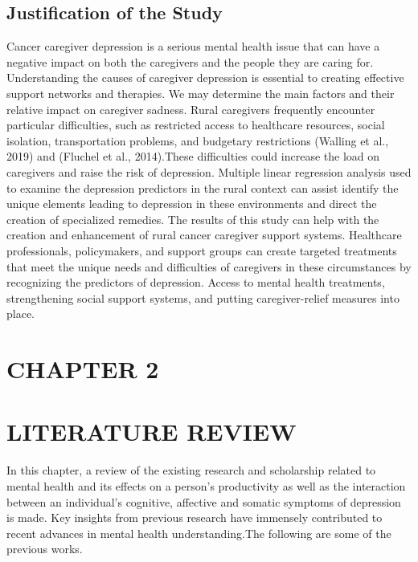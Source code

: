 \documentclass{article}
\numberwithin{equation}{section}
\begin{document}
\subsection{Justification of the Study}
Cancer caregiver depression is a serious mental health issue that can have a negative impact on both the caregivers and the people they are caring for. Understanding the causes of caregiver depression is essential to creating effective support networks and therapies. We may determine the main factors and their relative impact on caregiver sadness. Rural caregivers frequently encounter particular difficulties, such as restricted access to healthcare resources, social isolation, transportation problems, and budgetary restrictions (Walling et al., 2019) and (Fluchel et al., 2014).These difficulties could increase the load on caregivers and raise the risk of depression. Multiple linear regression analysis used to examine the depression predictors in the rural context can assist identify the unique elements leading to depression in these environments and direct the creation of specialized remedies. The results of this study can help with the creation and enhancement of rural cancer caregiver support systems. Healthcare professionals, policymakers, and support groups can create targeted treatments that meet the unique needs and difficulties of caregivers in these circumstances by recognizing the predictors of depression. Access to mental health treatments, strengthening social support systems, and putting caregiver-relief measures into place.

\newpage
	\section*{CHAPTER 2}
	\section*{LITERATURE REVIEW}
	In this chapter, a review of the existing research and scholarship related to mental health and its effects on a person’s productivity as well as the interaction between an individual’s cognitive, affective and somatic symptoms of depression is made. Key insights from previous research have immensely contributed to recent advances in mental health understanding.The following are some of the previous works.\\
	
\end{document}
